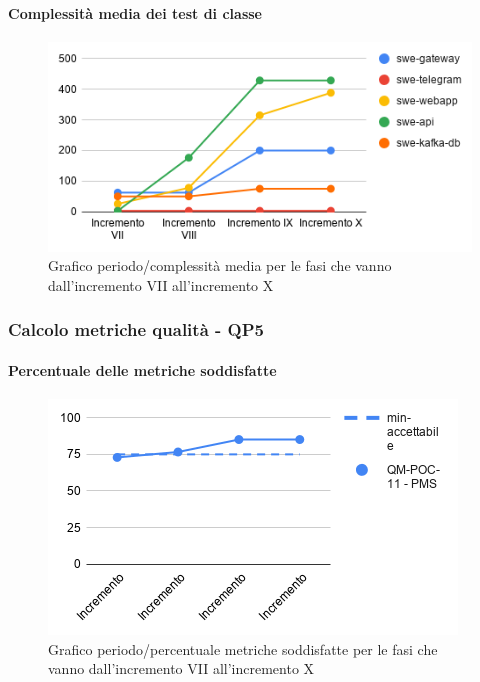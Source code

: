 \paragraph{Complessità media dei test di classe}
\begin{figure}[H]
			\centering
			\includegraphics[width=0.8\linewidth]{./res/images/QM-TEST-7-CMTC.png}
			\caption{Grafico periodo/complessità media per le fasi che vanno dall'incremento VII all'incremento X}
			\label{fig:Grafico periodo/complessità media per le fasi che vanno dall'incremento VII all'incremento X}
	\end{figure}


\subsubsection{Calcolo metriche qualità - QP5}
\paragraph{Percentuale delle metriche soddisfatte}
\begin{figure}[H]
			\centering
			\includegraphics[width=0.8\linewidth]{./res/images/QM-PROC-11-PMS.png}
			\caption{Grafico periodo/percentuale metriche soddisfatte per le fasi che vanno dall'incremento VII all'incremento X}
			\label{fig:Grafico periodo/percentuale metriche soddisfatte per le fasi che vanno dall'incremento VII all'incremento X}
	\end{figure}

